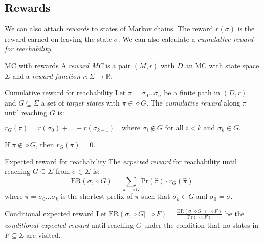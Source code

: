 \documentclass[english]{panikzettel}
\renewcommand{\Pr}{\mathrm{Pr}}
\newcommand{\ER}{\mathrm{ER}}
\newcommand{\rel}{\mathbb{R}}
\begin{document}
\subsection{Rewards}

\begin{halfboxl}
    We can also attach \emph{rewards} to states of Markov chains.
    The reward $r(\sigma)$ is the reward earned on leaving the state $\sigma$.
    We can also calculate a \emph{cumulative reward for reachability}.
\end{halfboxl}%
\begin{halfboxr}
    \vspace{-\baselineskip}
    \begin{defi}{MC with rewards}
        A \emph{reward MC} is a pair $(M,r)$ with $D$ an MC with state space $\Sigma$ and a \emph{reward function} $r : \Sigma \to \rel$.
    \end{defi}
\end{halfboxr}

\begin{defi}{Cumulative reward for reachability}
    Let $\pi = \sigma_0 \ldots \sigma_n$ be a finite path in $(D, r)$ and $G \subseteq \Sigma$ a set of \emph{target states} with $\pi \in \diamond G$.
    The \emph{cumulative reward} along $\pi$ until reaching $G$ is:
    \begin{tightcenter}$
        r_G(\pi) = r(\sigma_0) + \ldots + r(\sigma_{k-1}) \quad \text{where } \sigma_i \notin G \text{ for all } i < k \text{ and } \sigma_k \in G.
    $\end{tightcenter}

    If $\pi \notin \diamond G$, then $r_G(\pi) = 0$.
\end{defi}

\begin{defi}{Expected reward for reachability}
    The \emph{expected reward} for reachability until reaching $G \subseteq \Sigma$ from $\sigma \in \Sigma$ is:
    \[
        \ER(\sigma, \diamond G) = \sum_{\pi \models \diamond G} \Pr(\hat{\pi}) \cdot r_G(\hat{\pi})
    \]
    where $\hat{\pi} = \sigma_0 \ldots \sigma_k$ is the shortest prefix of $\pi$ such that $\sigma_k \in G$ and $\sigma_0 = \sigma$.
\end{defi}

\begin{defi}{Conditional expected reward}
    Let $\ER(\sigma, \diamond G | \neg \diamond F)=\frac{\ER(\sigma, \diamond G \cap \neg \diamond F)}{\Pr(\neg \diamond F)}$ be the \emph{conditional expected reward} until reaching $G$ under the condition that no states in $F \subseteq \Sigma$ are visited.
\end{defi}
\end{document}

